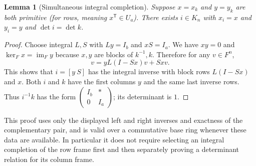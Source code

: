 \documentclass[11pt]{article}
\newtheorem{lemma}[theorem]{Lemma}
\theoremstyle{remark}\newtheorem{remark}[theorem]{Remark}
\begin{document}
\begin{lemma}[Simultaneous integral completion]\label{lem:completion}
Suppose $x=x_k$ and $y=y_k$ are both primitive (for rows, meaning $x^{\mathsf T}\in U_a$). There exists $i\in K_n$ with $x_i=x$ and $y_i=y$ and $\det i=\det k$.
\end{lemma}
\begin{proof}
Choose integral $L,S$ with $Ly=I_b$ and $xS=I_a$. We have $xy=0$ and $\ker_F x=\operatorname{im}_F y$ because $x,y$ are blocks of $k^{-1},k$. Therefore for any $v\in F^n$,
\[
 v=yL(I-Sx)v+Sxv.
\]
This shows that $i=[y\ S]$ has the integral inverse with block rows $L(I-Sx)$ and $x$. Both $i$ and $k$ have the first columns $y$ and the same last inverse rows. Thus $i^{-1}k$ has the form $\begin{pmatrix}I_b&*\\0&I_a\end{pmatrix}$; its determinant is $1$.
\end{proof}
This proof uses only the displayed left and right inverses and exactness of the complementary pair, and is valid over a commutative base ring whenever these data are available. In particular it does not require selecting an integral completion of the row frame first and then separately proving a determinant relation for its column frame.
\end{document}
